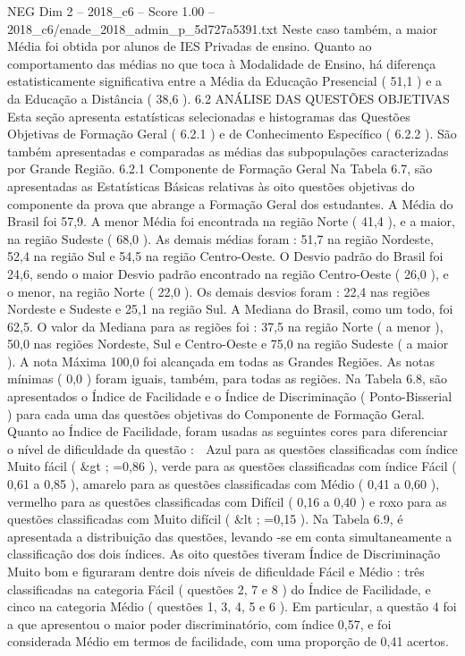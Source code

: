 \begin{textsample}{NEG Dim 2 – 2018\_c6 – Score 1.00 – 2018\_c6/enade\_2018\_admin\_p\_5d727a5391.txt}
Neste caso também, a maior Média foi obtida por alunos de IES Privadas de ensino.
Quanto ao comportamento das médias no que toca à Modalidade de Ensino, há diferença estatisticamente significativa entre a Média da Educação Presencial ( 51,1 ) e a da Educação a Distância ( 38,6 ). 6.2 ANÁLISE DAS QUESTÕES OBJETIVAS Esta seção apresenta estatísticas selecionadas e histogramas das Questões Objetivas de Formação Geral ( 6.2.1 ) e de Conhecimento Específico ( 6.2.2 ).
São também apresentadas e comparadas as médias das subpopulações caracterizadas por Grande Região. 6.2.1 Componente de Formação Geral Na Tabela 6.7, são apresentadas as Estatísticas Básicas relativas às oito questões objetivas do componente da prova que abrange a Formação Geral dos estudantes.
A Média do Brasil foi 57,9.
A menor Média foi encontrada na região Norte ( 41,4 ), e a maior, na região Sudeste ( 68,0 ).
As demais médias foram : 51,7 na região Nordeste, 52,4 na região Sul e 54,5 na região Centro-Oeste.
O Desvio padrão do Brasil foi 24,6, sendo o maior Desvio padrão encontrado na região Centro-Oeste ( 26,0 ), e o menor, na região Norte ( 22,0 ).
Os demais desvios foram : 22,4 nas regiões Nordeste e Sudeste e 25,1 na região Sul.
A Mediana do Brasil, como um todo, foi 62,5.
O valor da Mediana para as regiões foi : 37,5 na região Norte ( a menor ), 50,0 nas regiões Nordeste, Sul e Centro-Oeste e 75,0 na região Sudeste ( a maior ).
A nota Máxima 100,0 foi alcançada em todas as Grandes Regiões.
As notas mínimas ( 0,0 ) foram iguais, também, para todas as regiões.
Na Tabela 6.8, são apresentados o Índice de Facilidade e o Índice de Discriminação ( Ponto-Bisserial ) para cada uma das questões objetivas do Componente de Formação Geral.
Quanto ao Índice de Facilidade, foram usadas as seguintes cores para diferenciar o nível de dificuldade da questão :  Azul para as questões classificadas com índice Muito fácil ( \&gt ; =0,86 ), verde para as questões classificadas com índice Fácil ( 0,61 a 0,85 ), amarelo para as questões classificadas com Médio ( 0,41 a 0,60 ), vermelho para as questões classificadas com Difícil ( 0,16 a 0,40 ) e roxo para as questões classificadas com Muito difícil ( \&lt ; =0,15 ).
Na Tabela 6.9, é apresentada a distribuição das questões, levando -se em conta simultaneamente a classificação dos dois índices.
As oito questões tiveram Índice de Discriminação Muito bom e figuraram dentre dois níveis de dificuldade Fácil e Médio : três classificadas na categoria Fácil ( questões 2, 7 e 8 ) do Índice de Facilidade, e cinco na categoria Médio ( questões 1, 3, 4, 5 e 6 ).
Em particular, a questão 4 foi a que apresentou o maior poder discriminatório, com índice 0,57, e foi considerada Médio em termos de facilidade, com uma proporção de 0,41 acertos.

\end{textsample}
